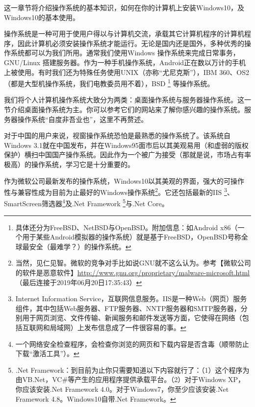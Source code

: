 \documentclass{book}
\begin{document}
这一章节将介绍操作系统的基本知识，如何在你的计算机上安装Windows10，及Windows10的基本使用。\par
操作系统是一种可用于使用户得以与计算机交流，承载其它计算机程序的计算机程序，因此计算机必须安装操作系统才能运行。无论是国内还是国外，多种优秀的操作系统都可以为我们所用。通常我们使用Windows 操作系统来完成日常事务，GNU/Linux 搭建服务器。作为一种手机操作系统，Android正在数以万计的手机上被使用。有时我们还为特殊任务使用UNIX（亦称“尤尼克斯”），IBM 360、OS2（都是大型机操作系统，我们电教委员用不着），BSD \footnote{具体还分为FreeBSD、NetBSD与OpenBSD。附加信息：如Android x86（一个用于某些Android模拟器的操作系统）就是基于FreeBSD，OpenBSD号称全球最安全（最难学？）的操作系统。} 等操作系统。\par
我们将个人计算机操作系统大致分为两类：桌面操作系统与服务器操作系统。这一节介绍桌面操作系统为主。你可以参考它们的网站来了解你感兴趣的操作系统。服务器操作系统“自度非吾业也”，这里不再赘述。\par
对于中国的用户来说，视窗操作系统恐怕是最熟悉的操作系统了。该系统自Windows 3.1就在中国发布，并在Windows95面市后以其美观易用（和虚弱的版权保护）横扫中国国产操作系统。因此作为一个被广为接受（那就是说，市场占有率极高）的操作系统，学习它是十分重要的。\par
作为微软公司最新发布的操作系统，Windows10以其美观的界面，强大的可操作性与兼容性成为目前为止最好的Windows操作系统\footnote{当然，见仁见智。微软的竞争对手比如说GNU就不这么认为。参考【微软公司的软件是恶意软件】\url{http://www.gnu.org/proprietary/malware-microsoft.html}（最后连接于2019年06月20日17:35:43）}。它还包括最新的IIS \footnote{Internet Information Service，互联网信息服务。IIS是一种Web（网页）服务组件，其中包括Web服务器、FTP服务器、NNTP服务器和SMTP服务器，分别用于网页浏览、文件传输、新闻服务和邮件发送等方面，它使得在网络（包括互联网和局域网）上发布信息成了一件很容易的事。\cite{iisinfo}}、SmartScreen筛选器\footnote{一个网络安全检查程序，会检查你浏览的网页和下载内容是否含毒（顺带防止下载“激活工具”）。}及.Net Framework \footnote{.Net Framework：到目前为止你只需要知道以下内容就行了：（1）这个程序为由VB.Net，VC\#等产生的应用程序提供承载平台。（2）对于Windows XP，你应该安装.Net Framework 4.0。对于Windows7，你至少应该安装.Net Framework 4.8。Windows10自带.Net Framework。}与.Net Core。\par

\end{window}
\end{document}
